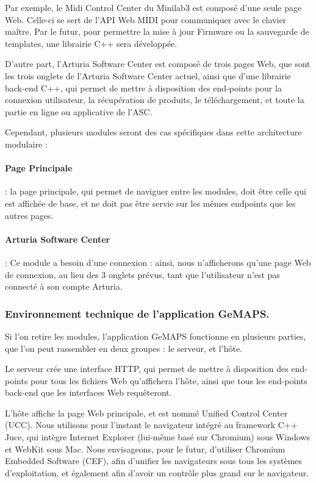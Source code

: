 \documentclass[francais]{rapportPFE}  %
\begin{document}
Par exemple, le Midi Control Center du Minilab3 est composé d'une seule page Web. Celle-ci se sert de l'API Web MIDI pour communiquer avec le clavier maître. Par le futur, pour permettre la mise à jour Firmware ou la sauvegarde de templates, une librairie C++ sera développée.

D'autre part, l'Arturia Software Center est composé de trois pages Web, que sont les trois onglets de l'Arturia Software Center actuel, ainsi que d'une librairie back-end C++, qui permet de mettre à disposition des end-points pour la connexion utilisateur, la récupération de produits, le téléchargement, et toute la partie en ligne ou applicative de l'ASC.

Cependant, plusieurs modules seront des cas spécifiques dans cette architecture modulaire :
\paragraph{Page Principale} : la page principale, qui permet de naviguer entre les modules, doit être celle qui est affichée de base, et ne doit pas être servie sur les mêmes endpoints que les autres pages.
\paragraph{Arturia Software Center} : Ce module a besoin d'une connexion : ainsi, nous n'afficherons qu'une page Web de connexion, au lieu des 3 onglets prévus, tant que l'utilisateur n'est pas connecté à son compte Arturia.



\subsubsection{Environnement technique de l'application GeMAPS.}

Si l'on retire les modules, l'application GeMAPS fonctionne en plusieurs parties, que l'on peut rassembler en deux groupes : le serveur, et l'hôte.

Le serveur crée une interface HTTP, qui permet de mettre à disposition des end-points pour tous les fichiers Web qu'affichera l'hôte, ainsi que tous les end-points back-end que les interfaces Web requêteront.

L'hôte affiche la page Web principale, et est nommé Unified Control Center (UCC). Nous utilisons pour l'instant le navigateur intégré au framework C++ Juce, qui intègre Internet Explorer (lui-même basé sur Chromium) sous Windows et WebKit sous Mac. Nous envisageons, pour le futur, d'utiliser Chromium Embedded Software (CEF), afin d'unifier les navigateurs sous tous les systèmes d'exploitation, et également afin d'avoir un contrôle plus grand sur le navigateur.
\end{document}
